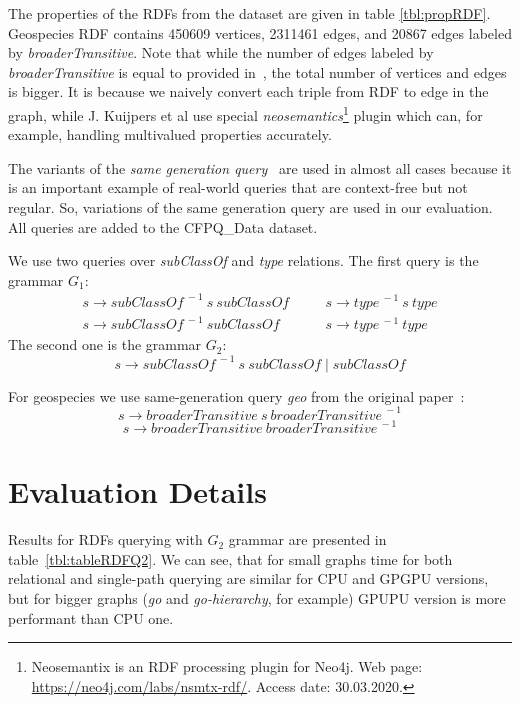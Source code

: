 The properties of the RDFs from the dataset are given in table \ref{tbl:propRDF}. 
Geospecies RDF contains 450609 vertices, 2311461 edges, and 20867 edges labeled by \textit{broaderTransitive}.
Note that while the number of edges labeled by \textit{broaderTransitive} is equal to provided in~\cite{Kuijpers:2019:ESC:3335783.3335791}, the total number of vertices and edges is bigger. It is because we naively convert each triple from RDF to edge in the graph, while J. Kuijpers et al use special \textit{neosemantics}\footnote{Neosemantix is an RDF processing plugin for Neo4j. Web page: \url{https://neo4j.com/labs/nsmtx-rdf/}. Access date: 30.03.2020.} plugin which can, for example, handling multivalued properties accurately.  

The variants of the \textit{same generation query}~\cite{FndDB} are used in almost all cases because it is an important example of real-world queries that are context-free but not regular.
So, variations of the same generation query are used in our evaluation.
All queries are added to the CFPQ\_Data dataset.

We use two queries over \textit{subClassOf} and \textit{type} relations.
The first query is the grammar $G_1$:
\[
 \begin{array}{lcl}
   s  \rightarrow \textit{subClassOf}^{\ -1} \ s \ \textit{subClassOf}   & \quad & s  \rightarrow \textit{type}^{\ -1} \ s \ \textit{type}     \\
   s  \rightarrow \textit{subClassOf}^{\ -1} \ \textit{subClassOf}       & \quad & s  \rightarrow  \textit{type}^{\ -1}  \ \textit{type}

 \end{array}
 \]
The second one is the grammar $G_2$: \[s \rightarrow \textit{subClassOf}^{\ -1} \ s \ \textit{subClassOf} \mid  \textit{subClassOf}\]

For geospecies we use same-generation query \textit{geo} from the original paper~\cite{Kuijpers:2019:ESC:3335783.3335791}: \[s \rightarrow \textit{broaderTransitive} \ s \ \textit{broaderTransitive}^{\ -1} \]
\[s \rightarrow \textit{broaderTransitive}  \ \textit{broaderTransitive}^{\ -1} \]


\section{Evaluation Details}

Results for RDFs querying with $G_2$ grammar are presented in table~\ref{tbl:tableRDFQ2}.
We can see, that for small graphs time for both relational and single-path querying are similar for CPU and GPGPU versions, but for bigger graphs (\textit{go} and \textit{go-hierarchy}, for example) GPUPU version is more performant than CPU one.

\balance

